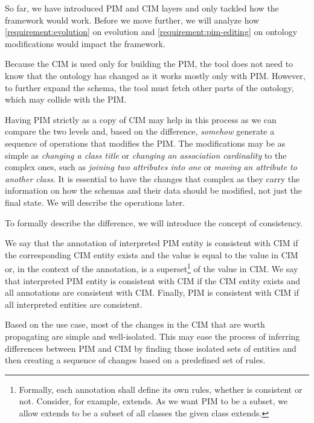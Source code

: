 So far, we have introduced PIM and CIM layers and only tackled how the framework would work. Before we move further, we will analyze how \autoref{requirement:evolution} on evolution and \ref{requirement:pim-editing} on ontology modifications would impact the framework.

Because the CIM is used only for building the PIM, the tool does not need to know that the ontology has changed as it works mostly only with PIM. However, to further expand the schema, the tool must fetch other parts of the ontology, which may collide with the PIM.

Having PIM strictly as a copy of CIM may help in this process as we can compare the two levels and, based on the difference, \textit{somehow} generate a sequence of operations that modifies the PIM. The modifications may be as simple as \textit{changing a class title} or \textit{changing an association cardinality} to the complex ones, such as \textit{joining two attributes into one} or \textit{moving an attribute to another class}. It is essential to have the changes that complex as they carry the information on how the schemas and their data should be modified, not just the final state. We will describe the operations later.

To formally describe the difference, we will introduce the concept of consistency.

\begin{definition}[consistency]
    We say that the annotation of interpreted PIM entity is consistent with CIM if the corresponding CIM entity exists and the value is equal to the value in CIM or, in the context of the annotation, is a superset\footnote{Formally, each annotation shall define its own rules, whether is consistent or not. Consider, for example, $\textrm{extends}$. As we want PIM to be a subset, we allow $\textrm{extends}$ to be a subset of all classes the given class extends.} of the value in CIM. We say that {interpreted PIM entity is consistent with CIM} if the CIM entity exists and all annotations are consistent with CIM. Finally, {PIM is consistent with CIM} if all interpreted entities are consistent.
\end{definition}

Based on the use case, most of the changes in the CIM that are worth propagating are simple and well-isolated. This may ease the process of inferring differences between PIM and CIM by finding those isolated sets of entities and then creating a sequence of changes based on a predefined set of rules.

